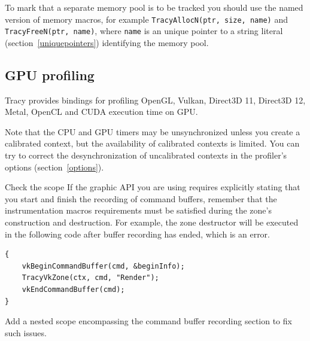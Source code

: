 \documentclass[hidelinks,titlepage,a4paper,twoside]{article}
\begin{document}
To mark that a separate memory pool is to be tracked you should use the named version of memory macros, for example \texttt{TracyAllocN(ptr, size, name)} and \texttt{TracyFreeN(ptr, name)}, where \texttt{name} is an unique pointer to a string literal (section~\ref{uniquepointers}) identifying the memory pool.

\subsection{GPU profiling}
\label{gpuprofiling}

Tracy provides bindings for profiling OpenGL, Vulkan, Direct3D 11, Direct3D 12, Metal, OpenCL and CUDA execution time on GPU.

Note that the CPU and GPU timers may be unsynchronized unless you create a calibrated context, but the availability of calibrated contexts is limited. You can try to correct the desynchronization of uncalibrated contexts in the profiler's options (section~\ref{options}).

\begin{bclogo}[
noborder=true,
couleur=black!5,
logo=\bclampe
]{Check the scope}
If the graphic API you are using requires explicitly stating that you start and finish the recording of command buffers, remember that the instrumentation macros requirements must be satisfied during the zone's construction and destruction. For example, the zone destructor will be executed in the following code after buffer recording has ended, which is an error.

\begin{lstlisting}
{
    vkBeginCommandBuffer(cmd, &beginInfo);
    TracyVkZone(ctx, cmd, "Render");
    vkEndCommandBuffer(cmd);
}
\end{lstlisting}

Add a nested scope encompassing the command buffer recording section to fix such issues.
\end{bclogo}
\end{document}
